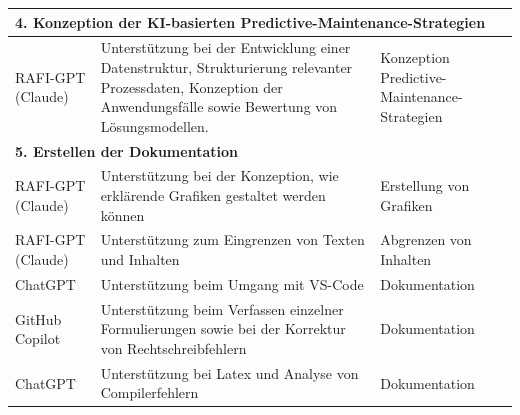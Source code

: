 \begin{tabular}{|p{2.2cm}|p{9.5cm}|p{3.5cm}|}
  \hline
  \multicolumn{3}{|l|}{\textbf{4. Konzeption der KI-basierten Predictive-Maintenance-Strategien}} \\
  \hline
  RAFI-GPT (Claude) &
  Unterstützung bei der Entwicklung einer Datenstruktur, Strukturierung relevanter Prozessdaten, Konzeption der Anwendungsfälle sowie Bewertung von Lösungsmodellen. &
  Konzeption Predictive-Maintenance-Strategien \\
  \hline
  \multicolumn{3}{|l|}{\textbf{5. Erstellen der Dokumentation}} \\
  \hline
  RAFI-GPT (Claude) & Unterstützung bei der Konzeption, wie erklärende Grafiken gestaltet werden können & Erstellung von Grafiken \\
  \hline
  RAFI-GPT (Claude) & Unterstützung zum Eingrenzen von Texten und Inhalten & Abgrenzen von Inhalten \\
  \hline
  ChatGPT & Unterstützung beim Umgang mit VS-Code & Dokumentation \\
  \hline
  GitHub Copilot & Unterstützung beim Verfassen einzelner Formulierungen sowie bei der Korrektur von Rechtschreibfehlern & Dokumentation\\
  \hline
  ChatGPT & Unterstützung bei Latex und Analyse von Compilerfehlern & Dokumentation \\
  \hline
\end{tabular}








